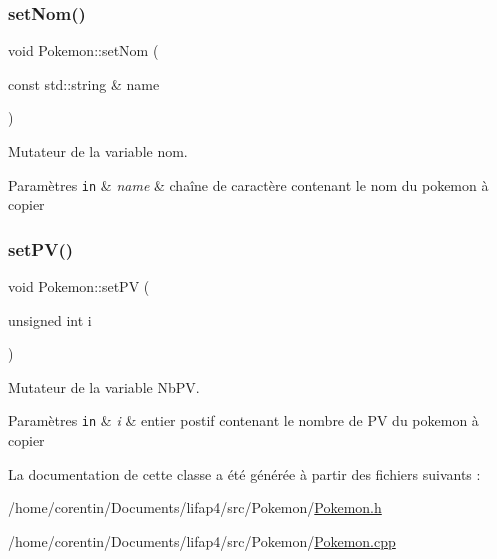 \subsubsection{\texorpdfstring{set\+Nom()}{setNom()}}
{\footnotesize\ttfamily void Pokemon\+::set\+Nom (\begin{DoxyParamCaption}\item[{const std\+::string \&}]{name }\end{DoxyParamCaption})}



Mutateur de la variable nom. 


\begin{DoxyParams}[1]{Paramètres}
\mbox{\tt in}  & {\em name} & chaîne de caractère contenant le nom du pokemon à copier \\
\hline
\end{DoxyParams}
\mbox{\label{class_pokemon_a2cc7213be7abb087f4b55b2a55816e55}} 
\subsubsection{\texorpdfstring{set\+P\+V()}{setPV()}}
{\footnotesize\ttfamily void Pokemon\+::set\+PV (\begin{DoxyParamCaption}\item[{unsigned int}]{i }\end{DoxyParamCaption})}



Mutateur de la variable Nb\+PV. 


\begin{DoxyParams}[1]{Paramètres}
\mbox{\tt in}  & {\em i} & entier postif contenant le nombre de PV du pokemon à copier \\
\hline
\end{DoxyParams}


La documentation de cette classe a été générée à partir des fichiers suivants \+:\begin{DoxyCompactItemize}
\item 
/home/corentin/\+Documents/lifap4/src/\+Pokemon/\hyperlink{_pokemon_8h}{Pokemon.\+h}\item 
/home/corentin/\+Documents/lifap4/src/\+Pokemon/\hyperlink{_pokemon_8cpp}{Pokemon.\+cpp}\end{DoxyCompactItemize}
